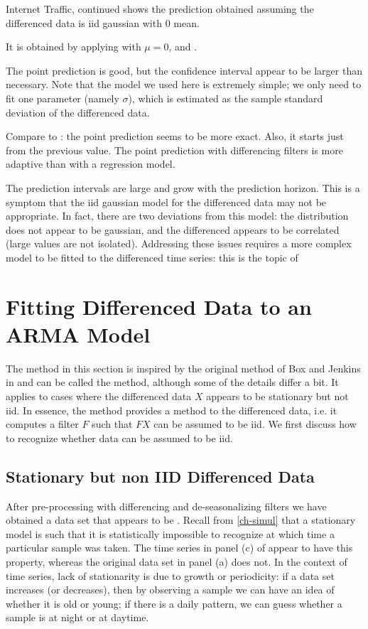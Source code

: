 \begin{exnn}{Internet Traffic, continued}
 shows the prediction obtained
assuming the differenced data is iid gaussian with $0$
mean.

It is obtained by applying  with
$\mu=0$,  and
.

The point prediction is good, but the confidence
interval appear to be larger than necessary. Note that
the model we used here is extremely simple; we only need to fit one parameter (namely $\sigma$), which is
estimated as the sample standard deviation of the
differenced data.

Compare to : the point
prediction seems to be more exact. Also, it starts
just from the previous value. The point prediction
with differencing filters is more adaptive than with a
regression model.

The prediction intervals are large and grow with the
prediction horizon. This is a symptom that the iid
gaussian model for the differenced data may not be
appropriate. In fact, there are two deviations from
this model: the distribution does not appear to be
gaussian, and the differenced appears to be correlated
(large values are not isolated). Addressing these
issues requires a more complex model to be fitted to
the differenced time series: this is the topic of
\end{exnn}


\section{Fitting Differenced Data to an ARMA Model}
\label{lin-ts} The method in this section is inspired
by the original method of Box and Jenkins in
\cite{bj70} and can be called the 
method, although some of the details differ a bit. It
applies to cases where the differenced data $X$
appears to be stationary but not iid. In essence, the
method provides a method to  the
differenced data, i.e. it computes a filter $F$ such
that $FX$ can be assumed to be iid. We first discuss
how to recognize whether data can be assumed to be
iid.
\subsection{Stationary but non IID
Differenced Data}After pre-processing with differencing and
de-seasonalizing filters we have obtained a data set that
appears to be . Recall from \cref{ch-simul}
that a stationary model is such that it is statistically
impossible to recognize at which time a particular sample was
taken. The time series in panel (c) of 
appear to have this property, whereas the original data set in
panel (a) does not. In the context of time series, lack of
stationarity is due to growth or periodicity: if a data set
increases (or decreases), then by observing a sample we can
have an idea of whether it is old or young; if there is a daily
pattern, we can guess whether a sample is at night or at
daytime.

